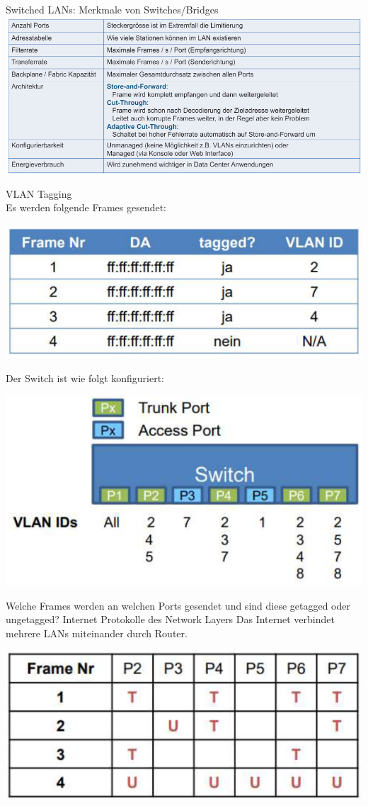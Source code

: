 \begin{theorem}{Switched LANs: Merkmale von Switches/Bridges}\\
    \includegraphics[width=1\linewidth]{images/merkmale_switches_bridges.png}
\end{theorem}

\begin{example2}{VLAN Tagging}\\
    Es werden folgende Frames gesendet:
    \begin{center}
        \includegraphics[width=0.6\linewidth]{images/bsp_vlan.png}
    \end{center}
    
    Der Switch ist wie folgt konfiguriert:
    \begin{center}
        \includegraphics[width=0.6\linewidth]{images/vlan_example_switch.png}
    \end{center}
    
    Welche Frames werden an welchen Ports gesendet und sind diese getagged oder ungetagged? Internet Protokolle des Network Layers Das Internet verbindet mehrere LANs miteinander durch Router.
    \begin{center}
        \includegraphics[width=0.5\linewidth]{images/vlan_example_frames.png}
    \end{center}
\end{example2}

